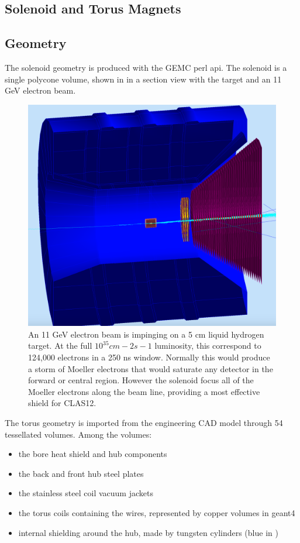 \subsection{Solenoid and Torus Magnets}


\subsection{Geometry}
The solenoid geometry is produced with the GEMC perl api. The solenoid is a single polycone volume, shown in 
in a section view with the target and an 11 GeV electron beam.

\begin{figure}
	\centering
	\includegraphics[width=0.98\columnwidth,keepaspectratio]{img/solenoid.png}
   \caption{An 11 GeV electron beam is impinging on a 5 cm liquid hydrogen target. At the full $10^{35} cm-2s-1$ luminosity, this correspond to
            124,000 electrons in a 250 ns window. Normally this would produce a storm of Moeller electrons that would saturate any detector in the forward or central
				region. However the solenoid focus all of the Moeller electrons along the beam line, providing a most effective shield for CLAS12.
            }
	\label{fig:solenoid}
\end{figure}

The torus geometry is imported from the engineering CAD model through 54 tessellated volumes. Among the volumes:

\begin{itemize}
	\item the bore heat shield and hub components
	\item the back and front hub steel plates
	\item the stainless steel coil vacuum jackets
	\item the torus coils containing the wires, represented by copper volumes in geant4
\item internal shielding around the hub, made by tungsten cylinders (blue in )
\end{itemize}

